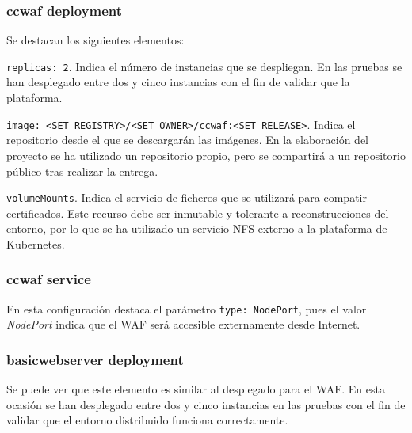 \subsubsection{ccwaf deployment}
\begin{minipage}{0.8\linewidth}
  
\end{minipage}
\par Se destacan los siguientes elementos:
\par \lstinline{replicas: 2}. Indica el número de instancias que se despliegan. En las pruebas se han desplegado entre dos y cinco instancias con el fin de validar que la plataforma.
\par \lstinline{image: <SET_REGISTRY>/<SET_OWNER>/ccwaf:<SET_RELEASE>}. Indica el repositorio desde el que
se descargarán las imágenes. En la elaboración del proyecto se ha utilizado un repositorio propio, pero se
compartirá a un repositorio público tras realizar la entrega.
\par \lstinline{volumeMounts}. Indica el servicio de ficheros que se utilizará para compatir certificados.
Este recurso debe ser inmutable y tolerante a reconstrucciones del entorno, por lo que se ha utilizado un
servicio NFS externo a la plataforma de Kubernetes.

\subsubsection{ccwaf service}
\begin{minipage}{0.8\linewidth}
  
\end{minipage}
\par En esta configuración destaca el parámetro \lstinline{type: NodePort}, pues el valor {\em NodePort}
indica que el WAF será accesible externamente desde Internet.

\subsubsection{ basicwebserver deployment}
\begin{minipage}{0.8\linewidth}
  
\end{minipage}
\par Se puede ver que este elemento es similar al desplegado para el WAF. En esta ocasión se han
desplegado entre dos y cinco instancias en las pruebas con el fin de validar que el entorno distribuido
funciona correctamente.


